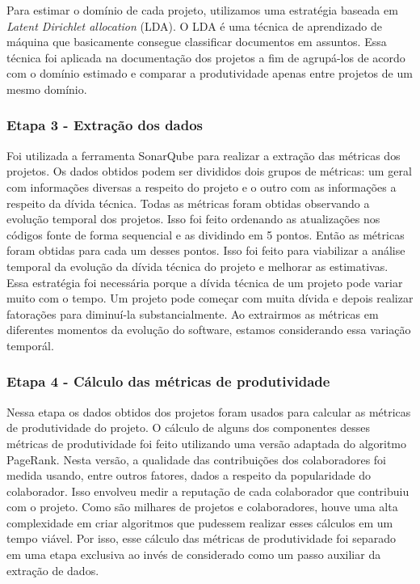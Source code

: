 Para estimar o domínio de cada projeto, utilizamos uma estratégia baseada em \textit{Latent Dirichlet allocation} (LDA)\cite{blei2003latent,hoffman2010online,blei2002latent}. O LDA é uma técnica de aprendizado de máquina que basicamente consegue classificar documentos em assuntos. Essa técnica foi aplicada na documentação dos projetos a fim de agrupá-los de acordo com o domínio estimado e comparar a produtividade apenas entre projetos de um mesmo domínio.




\subsubsection{Etapa 3 - Extração dos dados}


Foi utilizada a ferramenta SonarQube\cite{campbell2013sonarqube} para realizar a extração das métricas dos projetos. Os dados obtidos podem ser divididos dois grupos de métricas: um geral com informações diversas a respeito do projeto e o outro com as informações a respeito da dívida técnica. Todas as métricas foram obtidas observando a evolução temporal dos projetos. Isso foi feito ordenando as atualizações nos códigos fonte de forma sequencial e as dividindo em 5 pontos. Então as métricas foram obtidas para cada um desses pontos. Isso foi feito para viabilizar a análise temporal da evolução da dívida técnica do projeto e melhorar as estimativas. Essa estratégia foi necessária porque a dívida técnica de um projeto pode variar muito com o tempo. Um projeto pode começar com muita dívida e depois realizar fatorações para diminuí-la substancialmente. Ao extrairmos as métricas em diferentes momentos da evolução do software, estamos considerando essa variação temporál.


\subsubsection{Etapa 4 - Cálculo das métricas de produtividade}

Nessa etapa os dados obtidos dos projetos foram usados para calcular as métricas de produtividade do projeto. O cálculo de alguns dos componentes desses métricas de produtividade foi feito utilizando uma versão adaptada do algoritmo PageRank\cite{page1999pagerank}. Nesta versão, a qualidade das contribuições dos colaboradores foi medida usando, entre outros fatores, dados a respeito da popularidade do colaborador. Isso envolveu medir a reputação de cada colaborador que contribuiu com o projeto. Como são milhares de projetos e colaboradores, houve uma alta complexidade em criar algoritmos que pudessem realizar esses cálculos em um tempo viável. Por isso, esse cálculo das métricas de produtividade foi separado em uma etapa exclusiva ao invés de considerado como um passo auxiliar da extração de dados.


